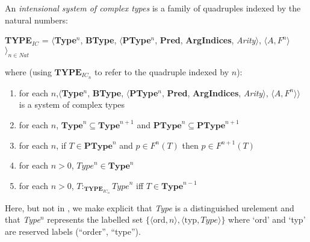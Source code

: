 
An {\it intensional system of complex types\/} is a family of
quadruples indexed by the natural numbers:
\begin{display}
{\bf TYPE$_\mathit{IC}$} = $\langle${\bf Type}$^n$, {\bf BType},
$\langle$\textbf{PType}$^n$, {\bf Pred}, \textbf{ArgIndices}, {\it
  Arity\/}$\rangle$, $\langle A,F^n\rangle$$\rangle_{n\in\mathit{Nat}}$
\end{display}
where (using $\mathbf{TYPE}_{\mathit{IC}_n}$ to refer to the quadruple
indexed by $n$):
\begin{enumerate} 
 
\item for each $n$,$\langle${\bf Type}$^n$, {\bf BType},
$\langle$\textbf{PType}$^n$, {\bf Pred}, \textbf{ArgIndices}, {\it
  Arity\/}$\rangle$, $\langle A,F^n\rangle$$\rangle$ is a 
system of complex types  
 
\item for each $n$, $\mathbf{Type}^n\subseteq\mathbf{Type}^{n+1}$ and
  $\mathbf{PType}^n\subseteq\mathbf{PType}^{n+1}$

\item for each $n$, if $T\in\mathbf{PType}^n$ and $p\in F^n(T)$ then
  $p\in F^{n+1}(T)$

\item for each $n>0$, $\mathit{Type}^n\in\mathbf{Type}^n$

\item for each $n>0$,
  $T:_{\mathbf{TYPE}_{\mathit{IC}_n}}\mathit{Type}^n$ iff $T\in\mathbf{Type}^{n-1}$
 
\end{enumerate}

Here, but not in \cite{Cooper2012}, we make explicit that
\textit{Type} is a distinguished urelement and that \textit{Type}$^n$
represents the labelled set
$\{\langle\mathrm{ord},n\rangle,\langle\mathrm{typ},\mathit{Type}\rangle\}$
where `ord' and `typ' are reserved labels (``order'', ``type'').

